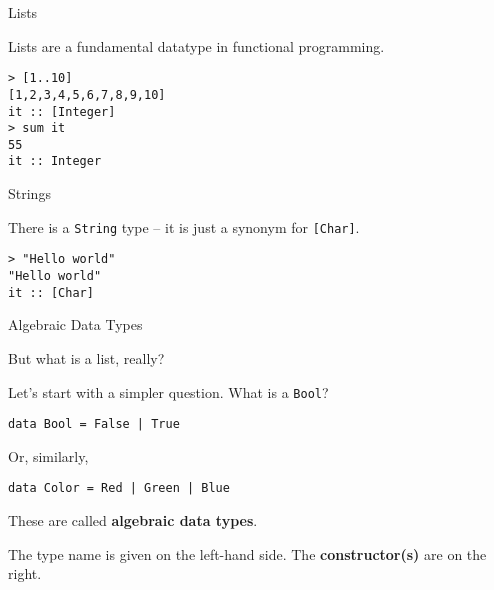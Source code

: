 %
\begin{frame}[fragile]{Lists}

Lists are a fundamental datatype in functional programming.

\begin{block}{}
\begin{verbatim}
> [1..10]
[1,2,3,4,5,6,7,8,9,10]
it :: [Integer]
> sum it
55
it :: Integer
\end{verbatim}
\end{block}

\end{frame}

%
\begin{frame}[fragile]{Strings}
  
There is a \texttt{String} type -- it is just a synonym for \texttt{[Char]}.

\begin{block}{}
\begin{verbatim}
> "Hello world"
"Hello world"
it :: [Char]
\end{verbatim}
\end{block}

\end{frame}

%
\begin{frame}[fragile]{Algebraic Data Types}

But what is a list, really?

Let's start with a simpler question. What is a \texttt{Bool}?

\begin{block}{}
\begin{verbatim}
data Bool = False | True
\end{verbatim}
\end{block}

Or, similarly,

\begin{block}{}
\begin{verbatim}
data Color = Red | Green | Blue
\end{verbatim}
\end{block}

These are called \textbf{algebraic data types}.

The type name is given on the left-hand side. The \textbf{constructor(s)}
are on the right.

\end{frame}


